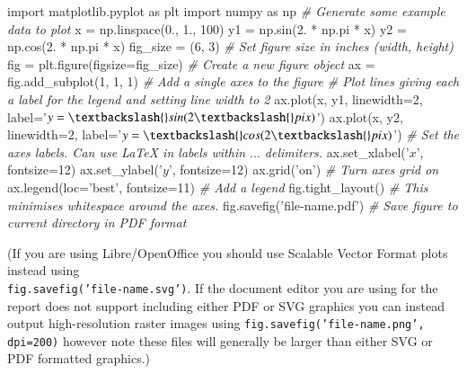 \documentclass[11pt,]{article}
\newenvironment{Shaded}{}{}
\newcommand{\DecValTok}[1]{\textcolor[rgb]{0.25,0.63,0.44}{{#1}}}
\newcommand{\CharTok}[1]{\textcolor[rgb]{0.25,0.44,0.63}{{#1}}}
\newcommand{\StringTok}[1]{\textcolor[rgb]{0.25,0.44,0.63}{{#1}}}
\newcommand{\CommentTok}[1]{\textcolor[rgb]{0.38,0.63,0.69}{\textit{{#1}}}}
\newcommand{\NormalTok}[1]{{#1}}
\begin{document}
\begin{Shaded}
\begin{Highlighting}[]
\CharTok{import} \NormalTok{matplotlib.pyplot }\CharTok{as} \NormalTok{plt}
\CharTok{import} \NormalTok{numpy }\CharTok{as} \NormalTok{np}
\CommentTok{# Generate some example data to plot}
\NormalTok{x = np.linspace(}\DecValTok{0}\NormalTok{., }\DecValTok{1}\NormalTok{., }\DecValTok{100}\NormalTok{)}
\NormalTok{y1 = np.sin(}\DecValTok{2}\NormalTok{. * np.pi * x)}
\NormalTok{y2 = np.cos(}\DecValTok{2}\NormalTok{. * np.pi * x)}
\NormalTok{fig_size = (}\DecValTok{6}\NormalTok{, }\DecValTok{3}\NormalTok{)  }\CommentTok{# Set figure size in inches (width, height)}
\NormalTok{fig = plt.figure(figsize=fig_size)  }\CommentTok{# Create a new figure object}
\NormalTok{ax = fig.add_subplot(}\DecValTok{1}\NormalTok{, }\DecValTok{1}\NormalTok{, }\DecValTok{1}\NormalTok{)  }\CommentTok{# Add a single axes to the figure}
\CommentTok{# Plot lines giving each a label for the legend and setting line width to 2}
\NormalTok{ax.plot(x, y1, linewidth=}\DecValTok{2}\NormalTok{, label=}\StringTok{'$y = \textbackslash{}sin(2\textbackslash{}pi x)$'}\NormalTok{)}
\NormalTok{ax.plot(x, y2, linewidth=}\DecValTok{2}\NormalTok{, label=}\StringTok{'$y = \textbackslash{}cos(2\textbackslash{}pi x)$'}\NormalTok{)}
\CommentTok{# Set the axes labels. Can use LaTeX in labels within $...$ delimiters.}
\NormalTok{ax.set_xlabel(}\StringTok{'$x$'}\NormalTok{, fontsize=}\DecValTok{12}\NormalTok{)}
\NormalTok{ax.set_ylabel(}\StringTok{'$y$'}\NormalTok{, fontsize=}\DecValTok{12}\NormalTok{)}
\NormalTok{ax.grid(}\StringTok{'on'}\NormalTok{)  }\CommentTok{# Turn axes grid on}
\NormalTok{ax.legend(loc=}\StringTok{'best'}\NormalTok{, fontsize=}\DecValTok{11}\NormalTok{)  }\CommentTok{# Add a legend}
\NormalTok{fig.tight_layout()  }\CommentTok{# This minimises whitespace around the axes.}
\NormalTok{fig.savefig(}\StringTok{'file-name.pdf'}\NormalTok{) }\CommentTok{# Save figure to current directory in PDF format}
\end{Highlighting}
\end{Shaded}

(If you are using Libre/OpenOffice you should use Scalable Vector Format
plots instead using \\
\texttt{fig.savefig('file-name.svg')}. If the
document editor you are using for the report does not support including
either PDF or SVG graphics you can instead output high-resolution raster
images using \texttt{fig.savefig('file-name.png', dpi=200)} however note
these files will generally be larger than either SVG or PDF formatted
graphics.)
\end{document}
